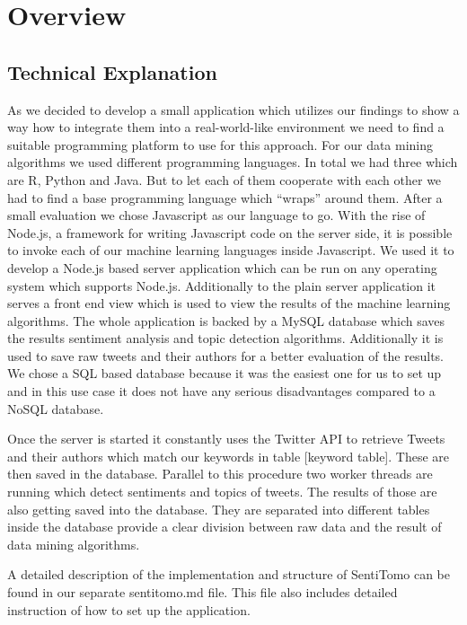 \documentclass[11pt,titlepage,oneside,openany]{book}
\begin{document}
\section{Overview}
\subsection{Technical Explanation}


As we decided to develop a small application which utilizes our findings to show a way how to integrate them into a real-world-like environment we need to find a suitable programming platform to use for this approach. For our data mining algorithms we used different programming languages. In total we had three which are R, Python and Java. But to let each of them cooperate with each other we had to find a base programming language which “wraps” around them. After a small evaluation we chose Javascript as our language to go. With the rise of Node.js, a framework for writing Javascript code on the server side, it is possible to invoke each of our machine learning languages inside Javascript. We used it to develop a Node.js based server application which can be run on any operating system which supports Node.js. Additionally to the plain server application it serves a front end view which is used to view the results of the machine learning algorithms. The whole application is backed by a MySQL database which saves the results sentiment analysis and topic detection algorithms. Additionally it is used to save raw tweets and their authors for a better evaluation of the results. We chose a SQL based database because it was the easiest one for us to set up and in this use case it does not have any serious disadvantages compared to a NoSQL database.

Once the server is started it constantly uses the Twitter API to retrieve Tweets and their authors which match our keywords in table [keyword table]. These are then saved in the database. Parallel to this procedure two worker threads are running which detect sentiments and topics of tweets. The results of those are also getting saved into the database. They are separated into different tables inside the database provide a clear division between raw data and the result of data mining algorithms. 

A detailed description of the implementation and structure of SentiTomo can be found in our separate sentitomo.md file. This file also includes detailed instruction of how to set up the application.
\end{document}
